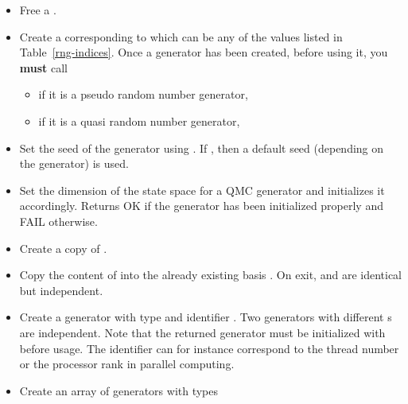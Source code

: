 \begin{itemize}
\item {}
  \sshortdescribe Free a \PnlRng.
\item {}
  \sshortdescribe Create a \PnlRng corresponding to 
  which can be any of the values  listed in
  Table~\ref{rng-indices}. Once a generator has been created, before using it, you {\bf must} call 
  \begin{itemize}
    \item {} if it is a pseudo random number generator,
    \item {} if it is a quasi random number generator,
  \end{itemize}
\item {}
  \sshortdescribe Set the seed of the generator  using . If
  , then a default seed (depending on the generator) is used.
\item {}
  \sshortdescribe Set the dimension of the state space for a QMC generator and
  initializes it accordingly.  Returns OK if the generator has been initialized
  properly and FAIL otherwise.
\item {}
  \sshortdescribe Create a copy of .
\item {}
  \sshortdescribe Copy the content of  into the already existing
  basis . On exit,  and  are identical but
  independent. 
\item {}
  \sshortdescribe Create a generator with type  and identifier
  . Two generators with different s are independent. Note that
  the returned generator must be initialized with  before
  usage. The identifier  can for instance correspond to the thread
  number or the processor rank in parallel computing.
\item {}
  \sshortdescribe Create an array of generators with types 

\end{itemize}
